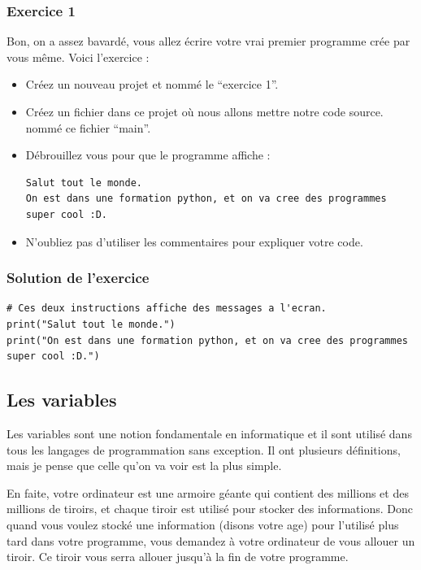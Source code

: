 \documentclass[12pt]{article}
\begin{document}
        \subsubsection{Exercice 1}
            Bon, on a assez bavardé, vous allez écrire votre vrai premier programme crée par vous même.
            Voici l'exercice :
            \begin{itemize}
                \item Créez un nouveau projet et nommé le ``exercice 1''.
                \item Créez un fichier dans ce projet où nous allons mettre notre code source. nommé ce fichier
                    ``main''.
                \item Débrouillez vous pour que le programme affiche :
                    \begin{lstlisting}[style=exec_result, breaklines=false]
Salut tout le monde.
On est dans une formation python, et on va cree des programmes super cool :D.
                    \end{lstlisting}
                \item N'oubliez pas d'utiliser les commentaires pour expliquer votre code.
            \end{itemize}

        \subsubsection{Solution de l'exercice}
            \begin{lstlisting}[style=code, breaklines=false]
# Ces deux instructions affiche des messages a l'ecran.
print("Salut tout le monde.")
print("On est dans une formation python, et on va cree des programmes super cool :D.")
            \end{lstlisting}

\clearpage

    \subsection{Les variables}
        Les variables sont une notion fondamentale en informatique et il sont utilisé dans tous les langages
        de programmation sans exception. Il ont plusieurs définitions, mais je pense que celle qu'on va voir est la plus simple.

        En faite, votre ordinateur est une armoire géante qui contient des millions et des millions de tiroirs, et
        chaque tiroir
        est utilisé pour stocker des informations. Donc quand vous voulez stocké une information (disons votre age)
        pour l'utilisé plus tard dans votre programme, vous demandez à votre ordinateur de vous allouer un tiroir.
        Ce tiroir vous serra allouer jusqu'à la fin de votre programme.
\end{document}
